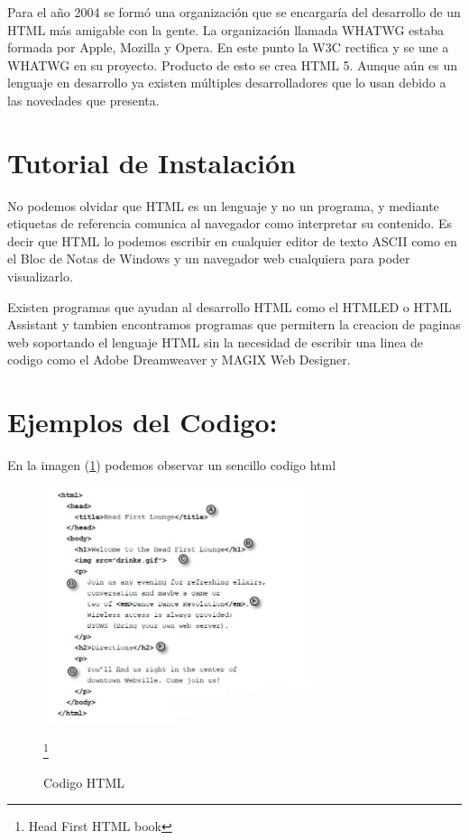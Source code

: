 \documentclass[11pt]{article} %
\begin{document}
\noindent Para el año 2004 se formó una organización que se encargaría del desarrollo de un HTML más amigable con la gente. La organización llamada WHATWG estaba formada por Apple, Mozilla y Opera. En este punto la W3C rectifica y se une a WHATWG en su proyecto. Producto de esto se crea HTML 5. Aunque aún es un lenguaje en desarrollo ya existen múltiples desarrolladores que lo usan debido a las novedades que presenta.\\
\section{Tutorial de Instalación}
No podemos olvidar que HTML es un lenguaje y no un programa, y mediante etiquetas de referencia comunica al navegador como interpretar su contenido.  Es decir que HTML lo podemos escribir en cualquier editor de texto ASCII como en el Bloc de Notas de Windows y un navegador web cualquiera para poder visualizarlo. \singlespace

\thinspace Existen programas que ayudan al desarrollo HTML como el  HTMLED o HTML Assistant y tambien encontramos programas que permitern la creacion de paginas web soportando el lenguaje HTML sin la necesidad de escribir una linea de codigo como el Adobe Dreamweaver y MAGIX Web Designer. 

\section{Ejemplos del Codigo:}


\begin{center}
En la imagen (\ref{fig:5.1})  podemos observar un sencillo codigo html 
\end{center}


\begin{figure}[htb]
\centering
\includegraphics[width=0.7\textwidth]{imagenes/img1.png}
\caption{Codigo HTML}
\label{fig:5.1}
\footnote{Head First HTML book}
\end{figure}
\end{document}
